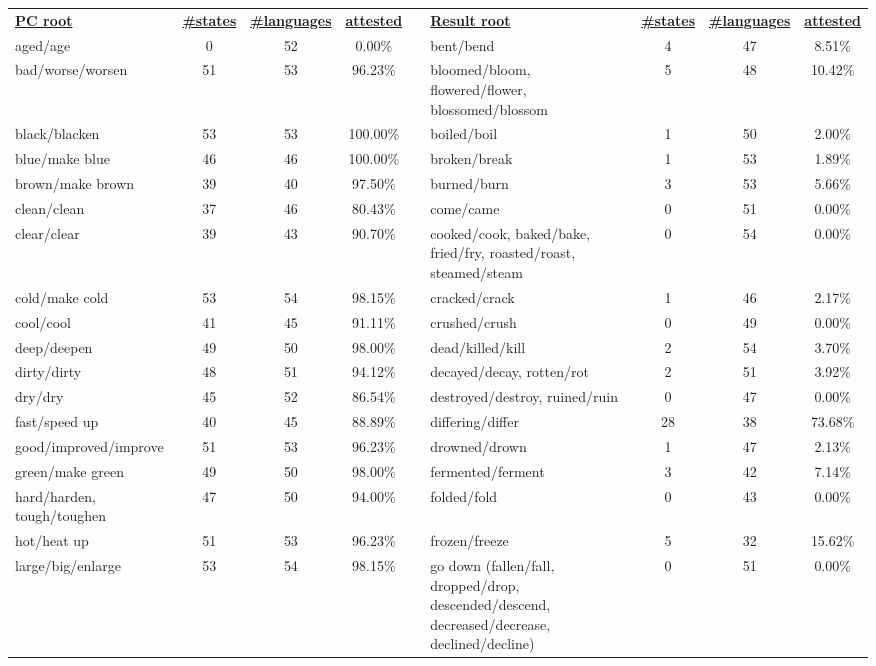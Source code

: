 \begin{tabular}{p{3cm}ccccp{3cm}ccc}
\underline{\textbf{PC root}} & \underline{\textbf{\#states}} & \underline{\textbf{\#languages}} & \underline{\textbf{attested}} & & \underline{\textbf{Result root}} & \underline{\textbf{\#states}} & \underline{\textbf{\#languages}} & \underline{\textbf{attested}} \\
aged/age & 0 & 52 & 0.00\% & & bent/bend & 4 & 47 & 8.51\% \\
bad/worse/worsen & 51 & 53 & 96.23\% & & bloomed/bloom, flowered/flower, blossomed/blossom & 5 & 48 & 10.42\% \\
black/blacken & 53 & 53 & 100.00\% & & boiled/boil & 1 & 50 & 2.00\% \\
blue/make blue & 46 & 46 & 100.00\% & & broken/break & 1 & 53 & 1.89\% \\
brown/make brown & 39 & 40 & 97.50\% & & burned/burn & 3 & 53 & 5.66\% \\
clean/clean & 37 & 46 & 80.43\% & & come/came & 0 & 51 & 0.00\% \\
clear/clear & 39 & 43 & 90.70\% & & cooked/cook, baked/bake, fried/fry, roasted/roast, steamed/steam & 0 & 54 & 0.00\% \\
cold/make cold & 53 & 54 & 98.15\% & & cracked/crack & 1 & 46 & 2.17\% \\
cool/cool & 41 & 45 & 91.11\% & & crushed/crush & 0 & 49 & 0.00\% \\
deep/deepen & 49 & 50 & 98.00\% & & dead/killed/kill & 2 & 54 & 3.70\% \\
dirty/dirty & 48 & 51 & 94.12\% & & decayed/decay, rotten/rot & 2 & 51 & 3.92\% \\
dry/dry & 45 & 52 & 86.54\% & & destroyed/destroy, ruined/ruin & 0 & 47 & 0.00\% \\
fast/speed up & 40 & 45 & 88.89\% & & differing/differ & 28 & 38 & 73.68\% \\
good/improved/improve & 51 & 53 & 96.23\% & & drowned/drown & 1 & 47 & 2.13\% \\
green/make green & 49 & 50 & 98.00\% & & fermented/ferment & 3 & 42 & 7.14\% \\
hard/harden, tough/toughen & 47 & 50 & 94.00\% & & folded/fold & 0 & 43 & 0.00\% \\
hot/heat up & 51 & 53 & 96.23\% & & frozen/freeze & 5 & 32 & 15.62\% \\
large/big/enlarge & 53 & 54 & 98.15\% & & go down (fallen/fall, dropped/drop, descended/descend, decreased/decrease, declined/decline) & 0 & 51 & 0.00\% \\

\end{tabular}
